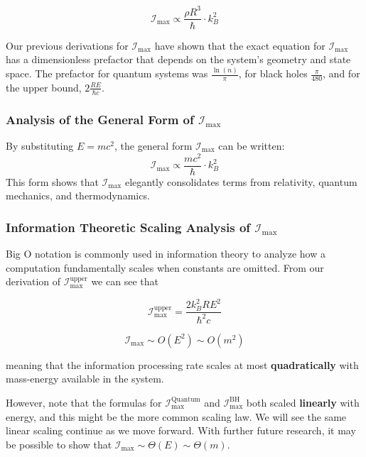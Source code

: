 \documentclass[12pt]{article}
\begin{document}
\begin{equation}
    \mathcal{I}_{\max} \propto \frac{\rho R^3}{\hbar} \cdot k_B^2
\end{equation}

Our previous derivations for $\mathcal{I}_{\max}$ have shown that the exact equation for $\mathcal{I}_{\max}$ has a dimensionless prefactor that depends on the system's geometry and state space. The prefactor for quantum systems was $\frac{\ln(n)}{\pi}$, for black holes $\frac{\pi}{480}$, and for the upper bound, $2 \frac{RE}{\hbar c}$.

\subsubsection{Analysis of the General Form of $\mathcal{I}_{\max}$}

By substituting $E = mc^2$, the general form \(\mathcal{I}_{\max}\) can be written:
\begin{equation}
    \mathcal{I}_{\max} \propto \frac{mc^2}{\hbar} \cdot k_B^2
\end{equation}
This form shows that \(\mathcal{I}_{\max}\) elegantly consolidates terms from relativity, quantum mechanics, and thermodynamics.

\subsubsection{Information Theoretic Scaling Analysis of $\mathcal{I}_{\max}$}

Big O notation is commonly used in information theory to analyze how a computation fundamentally scales when constants are omitted. From our derivation of $\mathcal{I}_{\text{max}}^{\text{upper}}$ we can see that

\[
\mathcal{I}_{\text{max}}^{\text{upper}} =\frac{2 k_B^2 R E^2}{\hbar^2 c}
\]

\begin{equation}
    \mathcal{I}_{\max} \sim O(E^2) \sim O(m^2)
\end{equation}

meaning that the information processing rate scales at most \textbf{quadratically} with mass-energy available in the system.

However, note that the formulas for $\mathcal{I}_{\text{max}}^{\text{Quantum}}$ and $\mathcal{I}_{\text{max}}^{\text{BH}}$ both scaled \textbf{linearly} with energy, and this might be the more common scaling law. We will see the same linear scaling continue as we move forward. With further future research, it may be possible to show that $\mathcal{I}_{\max} \sim \Theta(E) \sim \Theta(m)$.
\end{document}
